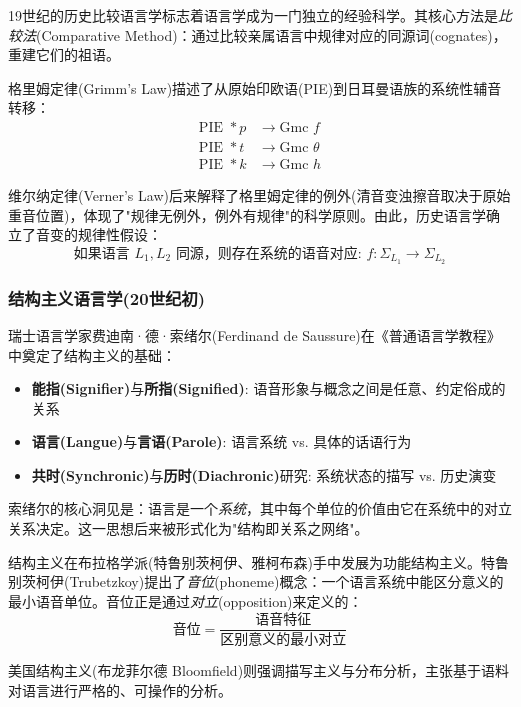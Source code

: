 19世纪的历史比较语言学标志着语言学成为一门独立的经验科学。其核心方法是\emph{比较法}(Comparative Method)：通过比较亲属语言中规律对应的同源词(cognates)，重建它们的祖语。

格里姆定律(Grimm's Law)描述了从原始印欧语(PIE)到日耳曼语族的系统性辅音转移：
\begin{align}
    \text{PIE } *p &\rightarrow \text{Gmc } f \\
    \text{PIE } *t &\rightarrow \text{Gmc } \theta \\
    \text{PIE } *k &\rightarrow \text{Gmc } h
\end{align}

维尔纳定律(Verner's Law)后来解释了格里姆定律的例外(清音变浊擦音取决于原始重音位置)，体现了"规律无例外，例外有规律"的科学原则。由此，历史语言学确立了音变的规律性假设：
\begin{equation}
    \text{如果语言 } L_1, L_2 \text{ 同源，则存在系统的语音对应: } f: \Sigma_{L_1} \rightarrow \Sigma_{L_2}
\end{equation}

\subsubsection{结构主义语言学(20世纪初)}

瑞士语言学家费迪南·德·索绪尔(Ferdinand de Saussure)在《普通语言学教程》中奠定了结构主义的基础：
\begin{itemize}
    \item \textbf{能指(Signifier)}与\textbf{所指(Signified)}: 语音形象与概念之间是任意、约定俗成的关系
    \item \textbf{语言(Langue)}与\textbf{言语(Parole)}: 语言系统 vs. 具体的话语行为
    \item \textbf{共时(Synchronic)}与\textbf{历时(Diachronic)}研究: 系统状态的描写 vs. 历史演变
\end{itemize}

索绪尔的核心洞见是：语言是一个\emph{系统}，其中每个单位的价值由它在系统中的对立关系决定。这一思想后来被形式化为"结构即关系之网络"。

结构主义在布拉格学派(特鲁别茨柯伊、雅柯布森)手中发展为功能结构主义。特鲁别茨柯伊(Trubetzkoy)提出了\emph{音位}(phoneme)概念：一个语言系统中能区分意义的最小语音单位。音位正是通过\emph{对立}(opposition)来定义的：
\begin{equation}
    \text{音位} = \frac{\text{语音特征}}{\text{区别意义的最小对立}}
\end{equation}

美国结构主义(布龙菲尔德 Bloomfield)则强调描写主义与分布分析，主张基于语料对语言进行严格的、可操作的分析。

